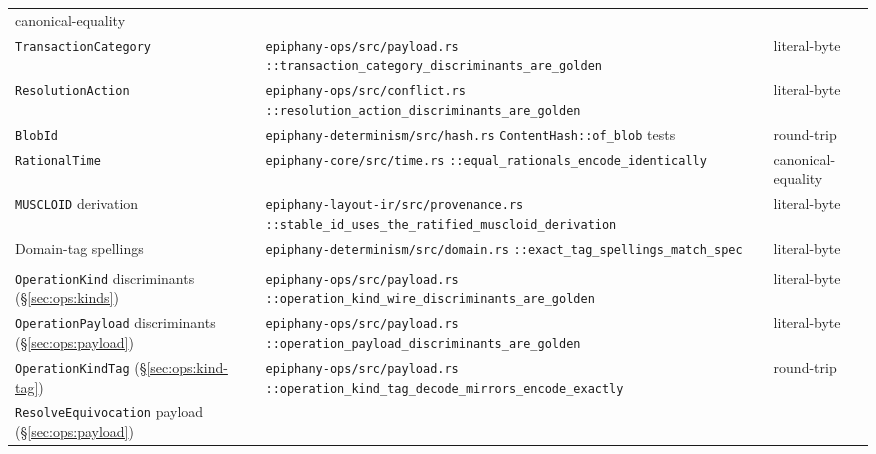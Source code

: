 \documentclass[11pt,letterpaper]{report}
\newcommand{\ub}{\_\allowbreak}
\begin{document}
\begin{longtable}{>{\raggedright\arraybackslash}p{1.5in} >{\raggedright\arraybackslash}p{3.0in} p{1.0in}}
    canonical-equality \\
  \texttt{TransactionCategory} &
    \texttt{epiphany-ops/src/payload.rs}\newline
    \texttt{::transaction\ub category\ub discriminants\ub are\ub golden} &
    literal-byte \\
  \texttt{ResolutionAction} &
    \texttt{epiphany-ops/src/conflict.rs}\newline
    \texttt{::resolution\ub action\ub discriminants\ub are\ub golden} &
    literal-byte \\
  \texttt{BlobId} &
    \texttt{epiphany-determinism/src/hash.rs}\newline
    \texttt{ContentHash::of\ub blob} tests &
    round-trip \\
  \texttt{RationalTime} &
    \texttt{epiphany-core/src/time.rs}\newline
    \texttt{::equal\ub rationals\ub encode\ub identically} &
    canonical-equality \\
  \texttt{MUSCLOID} derivation &
    \texttt{epiphany-layout-ir/src/provenance.rs}\newline
    \texttt{::stable\ub id\ub uses\ub the\ub ratified\ub muscloid\ub derivation} &
    literal-byte \\
  Domain-tag spellings &
    \texttt{epiphany-determinism/src/domain.rs}\newline
    \texttt{::exact\ub tag\ub spellings\ub match\ub spec} &
    literal-byte \\
  \addlinespace[4pt]
  \multicolumn{3}{l}{\emph{Added by this document:}} \\
  \addlinespace[2pt]
  \texttt{OperationKind} discriminants (\S\ref{sec:ops:kinds}) &
    \texttt{epiphany-ops/src/payload.rs}\newline
    \texttt{::operation\ub kind\ub wire\ub discriminants\ub are\ub golden} &
    literal-byte \\
  \texttt{OperationPayload} discriminants (\S\ref{sec:ops:payload}) &
    \texttt{epiphany-ops/src/payload.rs}\newline
    \texttt{::operation\ub payload\ub discriminants\ub are\ub golden} &
    literal-byte \\
  \texttt{OperationKindTag} (\S\ref{sec:ops:kind-tag}) &
    \texttt{epiphany-ops/src/payload.rs}\newline
    \texttt{::operation\ub kind\ub tag\ub decode\ub mirrors\ub encode\ub exactly} &
    round-trip \\
  \texttt{ResolveEquivocation} payload (\S\ref{sec:ops:payload}) &

\end{longtable}
\end{document}
